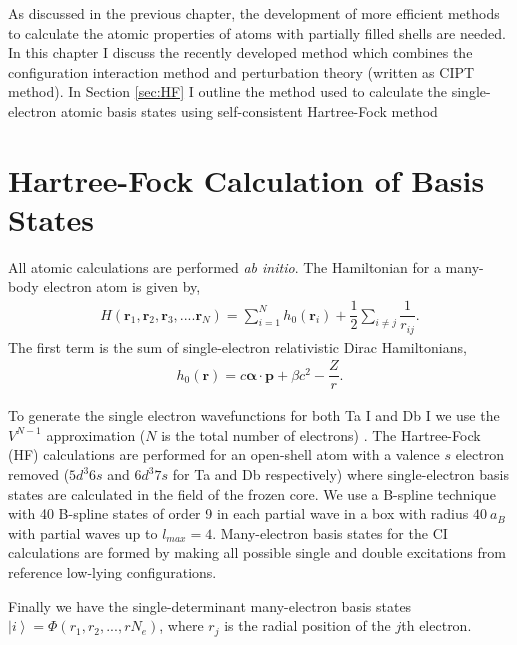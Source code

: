 \documentclass[10pt,a4paper, twoside]{report}
\begin{document}
As discussed in the previous chapter, the development of more efficient methods to calculate the atomic properties of atoms with partially filled shells are needed. In this chapter I discuss the recently developed method which combines the configuration interaction method and perturbation theory (written as CIPT method). In Section \ref{sec:HF} I outline the method used to calculate the single-electron atomic basis states using self-consistent Hartree-Fock method
\section{Hartree-Fock Calculation of Basis States}
All atomic calculations are performed \textit{ab initio}. The Hamiltonian for a many-body electron atom is given by,
\begin{align}
H\left(\textbf{r}_1,\textbf{r}_2, \textbf{r}_3, .... \textbf{r}_N\right) = \sum_{i=1}^{N} h_0\left(\textbf{r}_i\right) + \dfrac{1}{2}\sum_{i\neq j}\dfrac{1}{r_{ij}}.
\end{align}
The first term is the sum of single-electron relativistic Dirac Hamiltonians,
\begin{align*}
h_0\left(\textbf{r}\right) = c \boldsymbol{\alpha}\cdot\textbf{p} + \beta c^2 - \dfrac{Z}{r}.
\end{align*}




To generate the single electron wavefunctions for both Ta I and Db I  we use the $V^{N-1}$ approximation ($N$ is the total number of electrons) \cite{Kelly1964, Dzuba2005}. The Hartree-Fock (HF) calculations are performed for an open-shell atom with a valence $s$ electron removed ($5d^3 6s$ and $6d^3 7s$ for Ta  and Db respectively) where  single-electron basis states are calculated in the field of the frozen core. We use a  B-spline technique~\cite{Johnson1988}  with 40 B-spline states of order 9 in each partial wave in a box with radius $40 \ a_B$ with partial waves up to $l_{max}=4$. Many-electron basis states for the CI calculations are formed by making all possible single and double excitations from reference low-lying configurations. 


Finally we have the single-determinant many-electron basis states $\left|i\right> = \Phi\left(r_1, r_2, ... , r{N_e}\right)$, where $r_j$ is the radial position of the $j$th electron.
\end{document}
